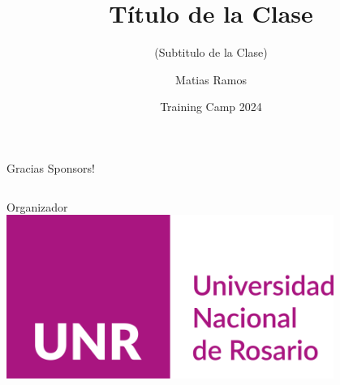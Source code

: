 \documentclass{beamer}
\title %
{Título de la Clase}
\subtitle{(Subtitulo de la Clase)}
\author[Matias Ramos]{Matias Ramos}
\institute[]{Universidad Tecnológica Nacional - Facultad Regional Santa Fe}
\date[TC 2024]{Training Camp 2024}
\begin{document}
\frame{\titlepage}



\begin{frame}{Gracias Sponsors!}
    \begin{columns}[t]
        \centering
        Organizador\\
        \vspace{0.8cm}
        \includegraphics[width=0.8\textwidth,keepaspectratio]{UNRlogo.png}


\end{columns}
\end{frame}
\end{document}
